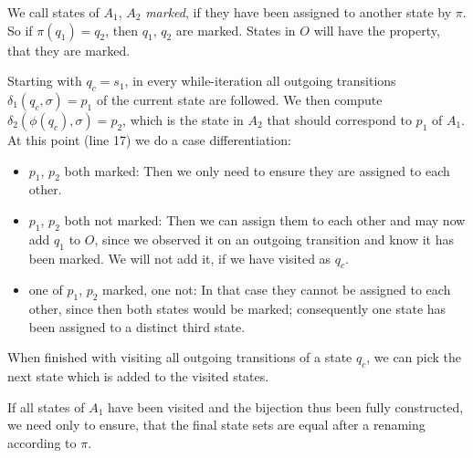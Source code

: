 We call states of $A_1$, $A_2$ \emph{marked}, if they have been assigned to another state by $\pi$. So if $\pi(q_1)=q_2$, then $q_1$, $q_2$ are marked. States in $O$ will have the property, that they are marked.

Starting with $q_c = s_1$, in every while-iteration all outgoing transitions $\delta_1(q_c, \sigma) = p_1$ of the current state are followed. We then compute $\delta_2(\phi(q_c), \sigma) = p_2$, which is the state in $A_2$ that should correspond to $p_1$ of $A_1$. At this point (line 17) we do a case differentiation:
\begin{itemize}
	\item $p_1$, $p_2$ both marked: Then we only need to ensure they are assigned to each other.
	\item $p_1$, $p_2$ both not marked: Then we can assign them to each other and may now add $q_1$ to $O$, since we observed it on an outgoing transition and know it has been marked. We will not add it, if we have visited as $q_c$.
	\item one of $p_1$, $p_2$ marked, one not: In that case they cannot be assigned to each other, since then both states would be marked; consequently one state has been assigned to a distinct third state.
\end{itemize}
When finished with visiting all outgoing transitions of a state $q_c$, we can pick the next state which is added to the visited states.

If all states of $A_1$ have been visited and the bijection thus been fully constructed, we need only to ensure, that the final state sets are equal after a renaming according to $\pi$.